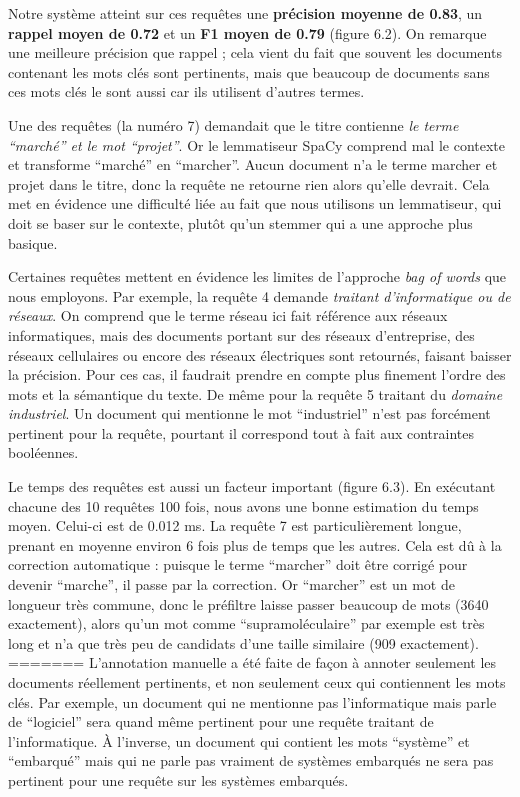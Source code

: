 Notre système atteint sur ces requêtes une \textbf{précision moyenne de 0.83}, un \textbf{rappel moyen de 0.72} et un \textbf{F1 moyen de 0.79} (figure 6.2). On remarque une meilleure précision que rappel ; cela vient du fait que souvent les documents contenant les mots clés sont pertinents, mais que beaucoup de documents sans ces mots clés le sont aussi car ils utilisent d'autres termes. 

Une des requêtes (la numéro 7) demandait que le titre contienne \textit{le terme ``marché'' et le mot ``projet''}. Or le lemmatiseur SpaCy comprend mal le contexte et transforme ``marché'' en ``marcher''. Aucun document n'a le terme marcher et projet dans le titre, donc la requête ne retourne rien alors qu'elle devrait. Cela met en évidence une difficulté liée au fait que nous utilisons un lemmatiseur, qui doit se baser sur le contexte, plutôt qu'un stemmer qui a une approche plus basique.

Certaines requêtes mettent en évidence les limites de l'approche \textit{bag of words} que nous employons. Par exemple, la requête 4 demande \textit{traitant d'informatique ou de réseaux}. On comprend que le terme réseau ici fait référence aux réseaux informatiques, mais des documents portant sur des réseaux d'entreprise, des réseaux cellulaires ou encore des réseaux électriques sont retournés, faisant baisser la précision. Pour ces cas, il faudrait prendre en compte plus finement l'ordre des mots et la sémantique du texte. De même pour la requête 5 traitant du \textit{domaine industriel}. Un document qui mentionne le mot ``industriel'' n'est pas forcément pertinent pour la requête, pourtant il correspond tout à fait aux contraintes booléennes.

Le temps des requêtes est aussi un facteur important (figure 6.3). En exécutant chacune des 10 requêtes 100 fois, nous avons une bonne estimation du temps moyen. Celui-ci est de 0.012 ms. La requête 7 est particulièrement longue, prenant en moyenne environ 6 fois plus de temps que les autres. Cela est dû à la correction automatique : puisque le terme ``marcher'' doit être corrigé pour devenir ``marche'', il passe par la correction. Or ``marcher'' est un mot de longueur très commune, donc le préfiltre laisse passer beaucoup de mots (3640 exactement), alors qu'un mot comme ``supramoléculaire'' par exemple est très long et n'a que très peu de candidats d'une taille similaire (909 exactement).  
=======
L'annotation manuelle a été faite de façon à annoter seulement les documents réellement pertinents, et non seulement ceux qui contiennent les mots clés. Par exemple, un document qui ne mentionne pas l'informatique mais parle de ``logiciel'' sera quand même pertinent pour une requête traitant de l'informatique. À l'inverse, un document qui contient les mots ``système'' et ``embarqué'' mais qui ne parle pas vraiment de systèmes embarqués ne sera pas pertinent pour une requête sur les systèmes embarqués.

